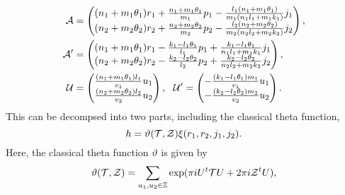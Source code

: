 \documentclass[12pt, a4paper]{article}
\newcommand{\Z}{{\mathbb Z}}
\begin{document}
\begin{align*}
 {\cal A} & = \begin{pmatrix} (n_1 +m_1 \theta_1)r_1 + \frac{n_1
+m_1 \theta_1}{m_1}p_1 - \frac{l_1(n_1 +m_1 \theta_1)}{m_1(n_1l_1
+m_1k_1)}j_1 \\
 (n_2 +m_2 \theta_2)r_2 + \frac{n_2 +m_2 \theta_2}{m_2}p_2 -
\frac{l_2(n_2 +m_2 \theta_2)}{m_2(n_2l_2 +m_2k_2)}j_2
\end{pmatrix} , \\
 {\cal A}' & = \begin{pmatrix} (n_1 +m_1 \theta_1)r_1 - \frac{k_1 - l_1
\theta_1}{l_1}p_1 + \frac{k_1 -l_1 \theta_1}{n_1l_1
+m_1k_1}j_1 \\
 (n_2 +m_2 \theta_2)r_2 - \frac{k_2 -l_2 \theta_2}{l_2}p_2 +
\frac{k_2 -l_2 \theta_2}{n_2l_2 +m_2k_2}j_2
\end{pmatrix}  , \\
 {\cal U} & = \begin{pmatrix} \frac{(n_1 +m_1 \theta_1)l_1}{v_1}u_1 \\
            \frac{(n_2 +m_2 \theta_2)l_2}{v_2}u_2  \end{pmatrix} , \ \
  {\cal U}'  = \begin{pmatrix} -\frac{(k_1-l_1\theta_1)m_1}{v_1}u_1 \\
  -\frac{(k_2-l_2\theta_2)m_2}{v_2}u_2
 \end{pmatrix} .
\end{align*}
This can be decompsed into two parts, including the classical
theta function,
\begin{equation}
h = {\cal \vartheta}({\cal T},{\cal Z}) \xi (r_1,r_2,j_1,j_2).
\end{equation}
Here, the classical theta function $\vartheta$ is given by
 \[ \vartheta ({\cal T},{\cal Z}) = \sum_{u_1, u_2 \in \Z} \exp ( \pi i U^t {\cal T} U
 + 2 \pi i {\cal Z}^t U ), \]
\end{document}

